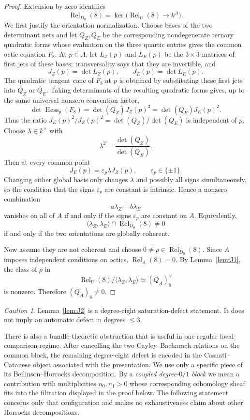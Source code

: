 \documentclass[11pt,reqno]{amsart}
\theoremstyle{remark}
\newtheorem{warning}[theorem]{Caution}
\newcommand{\Rel}{\operatorname{Rel}}
\begin{document}
\begin{proof}
Extension by zero identifies
\[
\Rel_{D_0}(8)
=\ker\bigl(\Rel_U(8)\longrightarrow k^A\bigr).
\]
We first justify the orientation normalization.  Choose bases of the two determinant nets and let $Q_Z,Q_E$ be the corresponding nondegenerate ternary quadratic forms whose evaluation on the three quartic entries gives the common octic equation $F_8$.  At $p\in A$, let $L_Z(p)$ and $L_E(p)$ be the $3\times3$ matrices of first jets of these bases; transversality says that they are invertible, and
\[
J_Z(p)=\det L_Z(p),
\qquad
J_E(p)=\det L_E(p).
\]
The quadratic tangent cone of $F_8$ at $p$ is obtained by substituting these first jets into $Q_Z$ or $Q_E$.  Taking determinants of the resulting quadratic forms gives, up to the same universal nonzero convention factor,
\[
\det\!\operatorname{Hess}_p(F_8)
=\det(Q_Z)J_Z(p)^2
=\det(Q_E)J_E(p)^2.
\]
Thus the ratio $J_E(p)^2/J_Z(p)^2=\det(Q_Z)/\det(Q_E)$ is independent of $p$.  Choose $\lambda\in k^\times$ with
\[
\lambda^2=\frac{\det(Q_Z)}{\det(Q_E)}.
\]
Then at every common point
\[
J_E(p)=\varepsilon_p\lambda J_Z(p),
\qquad
\varepsilon_p\in\{\pm1\}.
\]
Changing either global basis only changes $\lambda$ and possibly all signs simultaneously, so the condition that the signs $\varepsilon_p$ are constant is intrinsic.  Hence a nonzero combination
\[
a\lambda_Z+b\lambda_E
\]
vanishes on all of $A$ if and only if the signs $\varepsilon_p$ are constant on $A$.  Equivalently,
\[
\langle\lambda_Z,\lambda_E\rangle\cap\Rel_{D_0}(8)\ne0
\]
if and only if the two orientations are globally coherent.

Now assume they are not coherent and choose $0\ne\rho\in\Rel_{D_0}(8)$.  Since $A$ imposes independent conditions on octics, $\Rel_A(8)=0$.  By Lemma~\ref{lem:J1}, the class of $\rho$ in
\[
\Rel_U(8)/\langle\lambda_Z,\lambda_E\rangle\simeq(Q_A)_8^\vee
\]
is nonzero.  Therefore $(Q_A)_8\ne0$.
\end{proof}

\begin{warning}
Lemma~\ref{lem:J2} is a degree-eight saturation-defect statement.  It does not imply an automatic defect in degrees $\le3$.
\end{warning}

There is also a bundle-theoretic obstruction that is useful in one regular local-comparison regime.  After cancelling the two Cayley--Bacharach relations on the common block, the remaining degree-eight defect is encoded in the Casnati--Catanese object associated with the presentation.  We use only a specific piece of its Beilinson--Horrocks decomposition.  By a \emph{coupled degree-$0/1$ block} we mean a contribution with multiplicities $n_0,n_1>0$ whose corresponding cohomology sheaf fits into the filtration displayed in the proof below.  The following statement concerns only that configuration and makes no exhaustiveness claim about other Horrocks decompositions.
\end{document}
